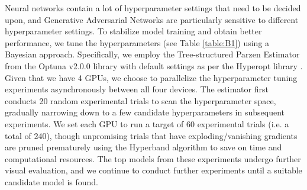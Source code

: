 \documentclass[tc, manuscript]{copernicus}
\begin{document}
Neural networks contain a lot of hyperparameter settings that need to be decided upon, and Generative Adversarial Networks are particularly sensitive to different hyperparameter settings.
To stabilize model training and obtain better performance, we tune the hyperparameters (see Table \ref{table:B1}) using a Bayesian approach.
Specifically, we employ the Tree-structured Parzen Estimator \citep{BergstraAlgorithmsHyperparameterOptimization2011} from the Optuna v2.0.0 \citep{AkibaOptunaNextgenerationHyperparameter2019} library with default settings as per the Hyperopt library \citep{BergstraHyperoptPythonlibrary2015}.
Given that we have 4 GPUs, we choose to parallelize the hyperparameter tuning experiments asynchronously between all four devices.
The estimator first conducts 20 random experimental trials to scan the hyperparameter space, gradually narrowing down to a few candidate hyperparameters in subsequent experiments.
We set each GPU to run a target of 60 experimental trials (i.e. a total of 240), though unpromising trials that have exploding/vanishing gradients are pruned prematurely using the Hyperband algorithm \citep{LiHyperbandNovelBanditBased2018} to save on time and computational resources.
The top models from these experiments undergo further visual evaluation, and we continue to conduct further experiments until a suitable candidate model is found.

\noappendix       %




\appendixfigures  %

\appendixtables   %

\end{document}
